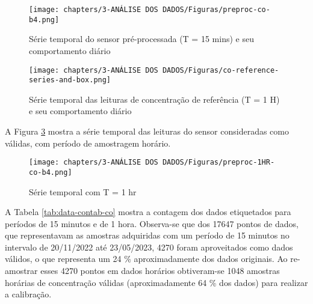 \begin{figure}[h]
    \centering
    \caption{Série temporal do sensor pré-processada (T = 15 mins) e seu comportamento diário}
    \texttt{[image: chapters/3-ANÁLISE DOS DADOS/Figuras/preproc-co-b4.png]}
    \label{fig:data-co-preproc-15}
\end{figure}

\begin{figure}[h]
    \centering
    \caption{Série temporal das leituras de concentração de referência (T = 1 H) e seu comportamento diário}
    \texttt{[image: chapters/3-ANÁLISE DOS DADOS/Figuras/co-reference-series-and-box.png]}
    \label{fig:data-co-reference}
\end{figure}

A Figura \ref{fig:data-co-preproc-1HR} mostra a série temporal das leituras do sensor consideradas como válidas, com período de amostragem horário.

\begin{figure}[h]
    \centering
    \caption{Série temporal com T = 1 hr}
    \texttt{[image: chapters/3-ANÁLISE DOS DADOS/Figuras/preproc-1HR-co-b4.png]}
    \label{fig:data-co-preproc-1HR}
\end{figure}

A Tabela \ref{tab:data-contab-co} mostra a contagem dos dados etiquetados para períodos de 15 minutos e de 1 hora. Observa-se que dos 17647 pontos de dados, que representavam as amostras adquiridas com um período de 15 minutos no intervalo de 20/11/2022 até 23/05/2023, 4270 foram aproveitados como dados válidos, o que representa um 24 \% aproximadamente dos dados originais. Ao re-amostrar esses 4270 pontos em dados horários obtiveram-se 1048 amostras horárias de concentração válidas (aproximadamente 64 \% dos dados) para realizar a calibração.

